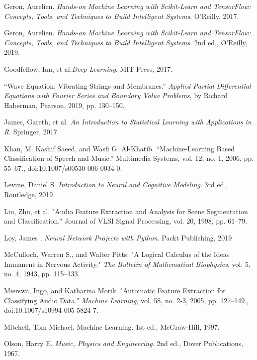 \documentclass[12pt,letterpaper]{article}
\begin{document}
\begin{thebibliography}{9}


Geron, Aurelien. \textit{Hands-on Machine Learning with Scikit-Learn and TensorFlow: Concepts, Tools, and Techniques to Build Intelligent Systems}. O'Reilly, 2017.

Geron, Aurelien. \textit{Hands-on Machine Learning with Scikit-Learn and TensorFlow: Concepts, Tools, and Techniques to Build Intelligent Systems}. 2nd ed., O'Reilly, 2019.

Goodfellow, Ian, et al.\textit{Deep Learning}. MIT Press, 2017.

“Wave Equation: Vibrating Strings and Membranes.” \textit{Applied Partial Differential Equations with Fourier Series and Boundary Value Problems}, by Richard Haberman, Pearson, 2019, pp. 130–150. 

James, Gareth, et al. \textit{An Introduction to Statistical Learning with Applications in R}. Springer, 2017.

Khan, M. Kashif Saeed, and Wasfi G. Al-Khatib. “Machine-Learning Based Classification of Speech and Music.” Multimedia Systems, vol. 12, no. 1, 2006, pp. 55–67., doi:10.1007/s00530-006-0034-0.

Levine, Daniel S. \textit{Introduction to Neural and Cognitive Modeling}. 3rd ed., Routledge, 2019.

Liu, Zhu, et al. "Audio Feature Extraction and Analysis for Scene Segmentation and Classification." Journal of VLSI Signal Processing, vol. 20, 1998, pp. 61–79.

Loy, James , \textit{Neural Network Projects with Python}. Packt Publishing, 2019

McCulloch, Warren S., and Walter Pitts. "A Logical Calculus of the Ideas Immanent in Nervous Activity." \textit{The Bulletin of Mathematical Biophysics}, vol. 5, no. 4, 1943, pp. 115–133.

Mierswa, Ingo, and Katharina Morik. "Automatic Feature Extraction for Classifying Audio Data." \textit{Machine Learning}, vol. 58, no. 2-3, 2005, pp. 127–149., doi:10.1007/s10994-005-5824-7.

Mitchell, Tom Michael. Machine Learning. 1st ed., McGraw-Hill, 1997.

Olson, Harry E. \textit{Music, Physics and Engineering}. 2nd ed., Dover Publications, 1967.


\end{thebibliography}
\end{document}
